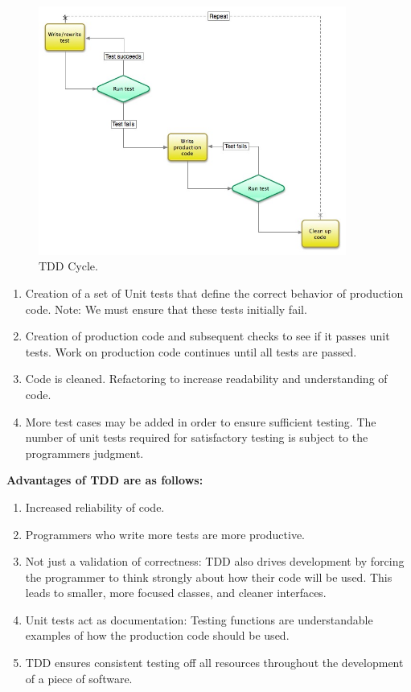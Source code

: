 \begin{figure}[h]
\centering
\includegraphics[width=0.9\textwidth]{figures/tdd-diagram-3.jpeg}
\caption{\label{fig:TDD1} TDD Cycle.}
\end{figure} 
     
\begin{enumerate}
\item Creation of a set of Unit tests that define the correct behavior of production code. Note: We must ensure that these tests initially fail. 
\item Creation of production code and subsequent checks to see if it passes  unit tests. Work on production code continues until all tests are passed.
\item Code is cleaned. Refactoring to increase readability and understanding of code.
\item More test cases may be added in order to ensure sufficient testing. The number of unit tests required for satisfactory testing is subject to the programmers judgment.
\end{enumerate}
     
\textbf{ Advantages of TDD are as follows:}
\begin{enumerate}
\item Increased reliability of code.
\item Programmers who write more tests are more productive.
\item Not just a validation of correctness: TDD also drives development by forcing the programmer to think strongly about how their code will be used. This leads to smaller, more focused classes, and cleaner interfaces.
\item Unit tests act as documentation: Testing functions are understandable examples of how the production code should be used.
\item TDD ensures consistent testing off all resources throughout the development of a piece of software.
\end{enumerate}

